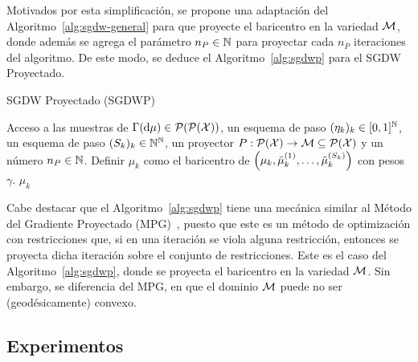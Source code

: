 Motivados por esta simplificación, se propone una adaptación del Algoritmo~\ref{alg:sgdw-general} para que proyecte el baricentro en la variedad $\Manifold$, donde además se agrega el parámetro $n_P\in\N$ para proyectar cada $n_P$ iteraciones del algoritmo. De este modo, se deduce el Algoritmo~\ref{alg:sgdwp} para el SGDW Proyectado.
\begin{algorithm}[H]
    \caption{SGDW Proyectado (SGDWP)}
    \label{alg:sgdwp}
    \begin{algorithmic}[1]
        \Require Acceso a las muestras de $\Gamma(\dd \mu) \in \ProbSpace[\ProbSpace]$, un esquema de paso $(\eta_k)_k \in [0, 1]^\N$, un esquema de paso $(S_k)_k \in \N^\N$, un proyector $P:\ProbSpace[\cX] \to \Manifold\subseteq \ProbSpace[\cX] $ y un número $n_P \in \N$.
        \Repeat
        \State Definir $\mu_k$ como el baricentro de $\qty( \mu_k, \tilde\mu_k^{(1)}, \dots, \tilde\mu_k^{(S_k)} )$ con pesos $\gamma$.
        \EndIf
        \State\Return $\mu_k$
    \end{algorithmic}
\end{algorithm}


Cabe destacar que el Algoritmo~\ref{alg:sgdwp} tiene una mecánica similar al Método del Gradiente Proyectado (MPG)~\cite[Secc. 5.1]{optimizacion2022amaya}, puesto que este es un método de optimización con restricciones que, si en una iteración se viola alguna restricción, entonces se proyecta dicha iteración sobre el conjunto de restricciones. Este es el caso del Algoritmo~\ref{alg:sgdwp}, donde se proyecta el baricentro en la variedad $\Manifold$. Sin embargo, se diferencia del MPG, en que el dominio $\Manifold$ puede no ser (geodésicamente) convexo.


\subsection{Experimentos}\label{ssec:sgdwp-experimentos}  %


